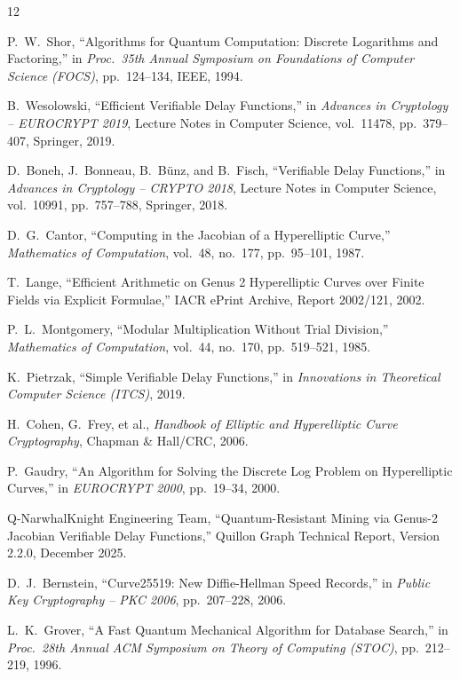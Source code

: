 \documentclass[11pt,a4paper]{article}
\begin{document}
\begin{thebibliography}{12}

P.~W.~Shor, ``Algorithms for Quantum Computation: Discrete Logarithms and Factoring,'' in \textit{Proc.\ 35th Annual Symposium on Foundations of Computer Science (FOCS)}, pp.~124--134, IEEE, 1994.

B.~Wesolowski, ``Efficient Verifiable Delay Functions,'' in \textit{Advances in Cryptology -- EUROCRYPT 2019}, Lecture Notes in Computer Science, vol.~11478, pp.~379--407, Springer, 2019.

D.~Boneh, J.~Bonneau, B.~B\"{u}nz, and B.~Fisch, ``Verifiable Delay Functions,'' in \textit{Advances in Cryptology -- CRYPTO 2018}, Lecture Notes in Computer Science, vol.~10991, pp.~757--788, Springer, 2018.

D.~G.~Cantor, ``Computing in the Jacobian of a Hyperelliptic Curve,'' \textit{Mathematics of Computation}, vol.~48, no.~177, pp.~95--101, 1987.

T.~Lange, ``Efficient Arithmetic on Genus 2 Hyperelliptic Curves over Finite Fields via Explicit Formulae,'' IACR ePrint Archive, Report 2002/121, 2002.

P.~L.~Montgomery, ``Modular Multiplication Without Trial Division,'' \textit{Mathematics of Computation}, vol.~44, no.~170, pp.~519--521, 1985.

K.~Pietrzak, ``Simple Verifiable Delay Functions,'' in \textit{Innovations in Theoretical Computer Science (ITCS)}, 2019.

H.~Cohen, G.~Frey, et al., \textit{Handbook of Elliptic and Hyperelliptic Curve Cryptography}, Chapman \& Hall/CRC, 2006.

P.~Gaudry, ``An Algorithm for Solving the Discrete Log Problem on Hyperelliptic Curves,'' in \textit{EUROCRYPT 2000}, pp.~19--34, 2000.

Q-NarwhalKnight Engineering Team, ``Quantum-Resistant Mining via Genus-2 Jacobian Verifiable Delay Functions,'' Quillon Graph Technical Report, Version 2.2.0, December 2025.

D.~J.~Bernstein, ``Curve25519: New Diffie-Hellman Speed Records,'' in \textit{Public Key Cryptography -- PKC 2006}, pp.~207--228, 2006.

L.~K.~Grover, ``A Fast Quantum Mechanical Algorithm for Database Search,'' in \textit{Proc.\ 28th Annual ACM Symposium on Theory of Computing (STOC)}, pp.~212--219, 1996.

\end{thebibliography}
\end{document}
